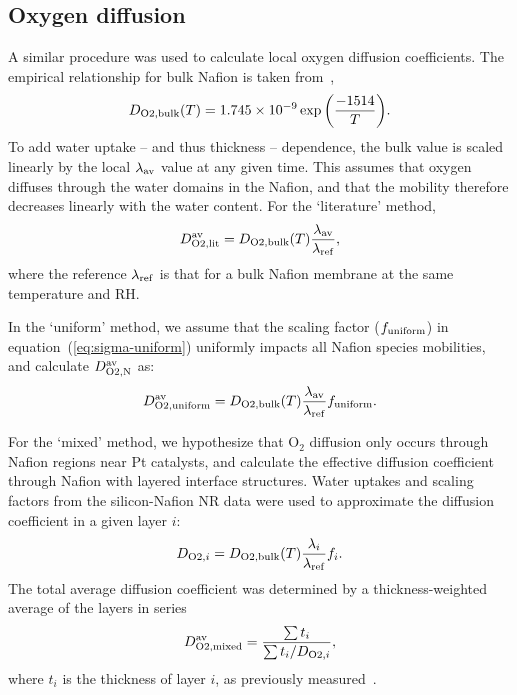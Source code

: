\documentclass[final,3p,times,twocolumn]{elsarticle}    %
\newcommand{\crr}[1]{\color{red} #1 \color{black}}
\begin{document}
\subsection{Oxygen diffusion}
\label{sect:oxygen-diffusivity}
\crr{
A similar procedure was used to calculate local oxygen diffusion coefficients. The empirical relationship for bulk Nafion is taken from~\cite{bib:sethuraman_2009},
\begin{equation}
    D_{\rm O2, bulk}(T) = 1.745 \times 10^{-9} \exp \bigg( \frac{-1514}{T} \bigg).
\end{equation}
To add water uptake -- and thus thickness -- dependence, the bulk value is scaled linearly by the local $\lambda_{\rm av}$ value at any given time. This assumes that oxygen diffuses through the water domains in the Nafion, and that the mobility therefore decreases linearly with the water content. For the `literature' method,
\begin{equation}
    D_{\rm O2, lit}^{\rm av} = D_{\rm O2, bulk}(T) \frac{\lambda_{\rm av}}{\lambda_{\rm ref}},
\end{equation}
where the reference $\lambda_{\rm ref}$ is that for a bulk Nafion membrane at the same temperature and RH.

In the `uniform' method, we assume that the scaling factor ($f_{\rm uniform}$) in equation~(\ref{eq:sigma-uniform}) uniformly impacts all Nafion species mobilities, and calculate $D_{\rm O2, N}^{\rm av}$ as:
\begin{equation}
    D_{\rm O2, uniform}^{\rm av} = D_{\rm O2, bulk}(T) \frac{\lambda_{\rm av}}{\lambda_{\rm ref}} f_{\rm uniform}.
\end{equation}

For the `mixed' method, we hypothesize that O$_2$ diffusion only occurs through Nafion regions near Pt catalysts, and calculate the effective diffusion coefficient through Nafion with layered interface structures. Water uptakes and scaling factors from the silicon-Nafion NR data were used to approximate the diffusion coefficient in a given layer $i$:
\begin{equation}
    D_{{\rm O2},i} = D_{\rm O2, bulk}(T) \frac{\lambda_{i}}{\lambda_{\rm ref}} f_{i}.
\end{equation}
The total average diffusion coefficient was determined by a thickness-weighted average of the layers in series
\begin{equation}
    D_{\rm O2, mixed}^{\rm av} = \frac{\sum t_i}{\sum t_i / D_{{\rm O2},i}},
\end{equation}
where $t_i$ is the thickness of layer $i$, as previously measured~\cite{bib:decaluwe_2018}.
}
\end{document}

